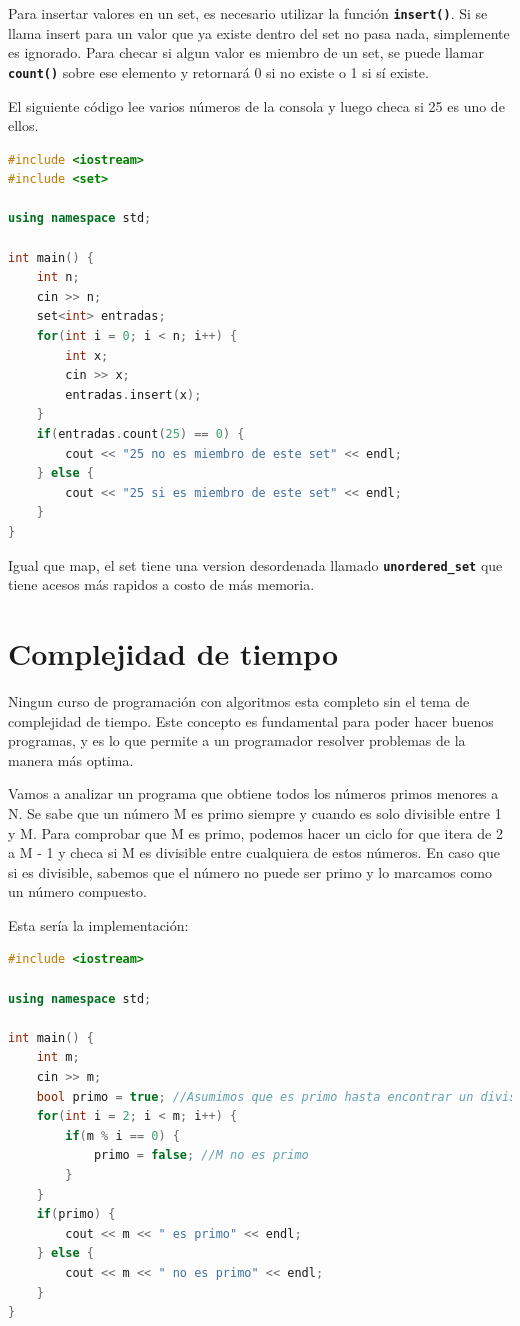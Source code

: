 \documentclass{article}
\begin{document}
Para insertar valores en un set, es necesario utilizar la función \textbf{\lstinline{insert()}}. Si se llama insert para un valor que ya existe dentro del set no pasa nada, simplemente es ignorado. Para checar si algun valor es miembro de un set, se puede llamar \textbf{\lstinline{count()}} sobre ese elemento y retornará 0 si no existe o 1 si sí existe.

El siguiente código lee varios números de la consola y luego checa si 25 es uno de ellos.

\begin{lstlisting}[language=C++, caption=Sets]
#include <iostream>
#include <set>

using namespace std;

int main() {
    int n;
    cin >> n;
    set<int> entradas;
    for(int i = 0; i < n; i++) {
        int x;
        cin >> x;
        entradas.insert(x);
    }
    if(entradas.count(25) == 0) {
        cout << "25 no es miembro de este set" << endl;
    } else {
        cout << "25 si es miembro de este set" << endl;
    }
}
\end{lstlisting}

Igual que map, el set tiene una version desordenada llamado \textbf{\lstinline{unordered_set}} que tiene acesos más rapidos a costo de más memoria.

\section{Complejidad de tiempo}

Ningun curso de programación con algoritmos esta completo sin el tema de complejidad de tiempo. Este concepto es fundamental para poder hacer buenos programas, y es lo que permite a un programador resolver problemas de la manera más optima.

Vamos a analizar un programa que obtiene todos los números primos menores a N. Se sabe que un número M es primo siempre y cuando es solo divisible entre 1 y M. Para comprobar que M es primo, podemos hacer un ciclo for que itera de 2 a M - 1 y checa si M es divisible entre cualquiera de estos números. En caso que si es divisible, sabemos que el número no puede ser primo y lo marcamos como un número compuesto.

Esta sería la implementación:

\begin{lstlisting}[language=C++, caption=Probando si M es primo]
#include <iostream>

using namespace std;

int main() {
    int m;
    cin >> m;
    bool primo = true; //Asumimos que es primo hasta encontrar un divisor
    for(int i = 2; i < m; i++) {
        if(m % i == 0) {
            primo = false; //M no es primo
        }
    }
    if(primo) {
        cout << m << " es primo" << endl;
    } else {
        cout << m << " no es primo" << endl;
    }
}
\end{lstlisting}
\end{document}
